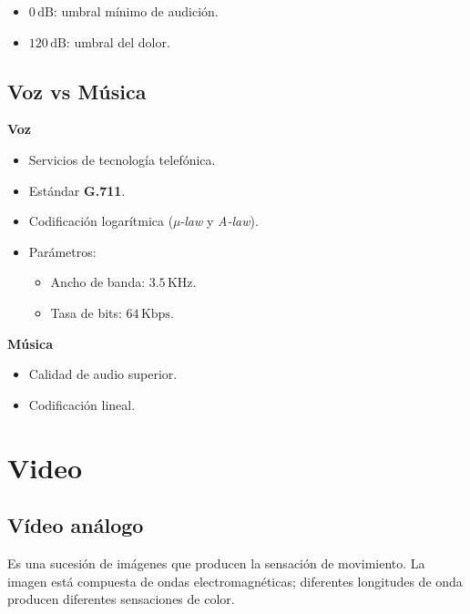 \documentclass[11pt,a4paper]{article}
\begin{document}
\begin{itemize}
    \item $0 \,\text{dB}$: umbral mínimo de audición.
    \item $120 \,\text{dB}$: umbral del dolor.
\end{itemize}

\subsection*{Voz vs Música}

\textbf{Voz}
\begin{itemize}
    \item Servicios de tecnología telefónica.
    \item Estándar \textbf{G.711}.
    \item Codificación logarítmica (\textit{µ-law} y \textit{A-law}).
    \item Parámetros:
    \begin{itemize}
        \item Ancho de banda: $3.5 \,\text{KHz}$.
        \item Tasa de bits: $64 \,\text{Kbps}$.
    \end{itemize}
\end{itemize}

\textbf{Música}
\begin{itemize}
    \item Calidad de audio superior.
    \item Codificación lineal.
\end{itemize}

\section{Video}

\subsection{Vídeo análogo}

Es una sucesión de imágenes que producen la sensación de movimiento. La imagen está compuesta de ondas electromagnéticas; diferentes longitudes de onda producen diferentes sensaciones de color.
\end{document}
